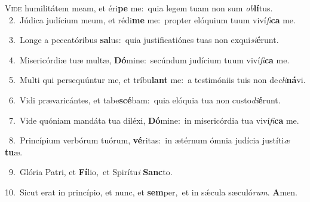 \lettrine{\initial\textcolor{\initialcolor}{V}}{ide} humilitátem meam, et éri\textbf{pe} me:~\star quia legem tuam non sum \textit{ob}\-\textbf{lí}tus.\\
{\numbfont\textcolor{\numbcolor}{~2.}}~Júdica judícium meum, et rédi\textbf{me} me:~\star propter elóquium tuum viví\-\textit{fi}\-\textbf{ca} me.\par
{\numbfont\textcolor{\numbcolor}{~3.}}~Longe a peccatóribus \textbf{sa}\-lus:~\star quia justificatiónes tuas non exqui\-\textit{si}\-\textbf{é}runt.\par
{\numbfont\textcolor{\numbcolor}{~4.}}~Misericórdiæ tuæ multæ, \textbf{Dó}\-mine:~\star secúndum judícium tuum viví\-\textit{fi}\-\textbf{ca} me.\par
{\numbfont\textcolor{\numbcolor}{~5.}}~Multi qui persequúntur me, et tríbu\textbf{lant} me:~\star a testimóniis tuis non de\-\textit{cli}\-\textbf{ná}vi.\par
{\numbfont\textcolor{\numbcolor}{~6.}}~Vidi prævaricántes, et tabe\-\textbf{scé}\-bam:~\star quia elóquia tua non custo\-\textit{di}\-\textbf{é}runt.\par
{\numbfont\textcolor{\numbcolor}{~7.}}~Vide quóniam mandáta tua diléxi, \textbf{Dó}\-mine:~\star in misericórdia tua viví\-\textit{fi}\-\textbf{ca} me.\par
{\numbfont\textcolor{\numbcolor}{~8.}}~Princípium verbórum tuórum, \textbf{vé}\-ritas:~\star in ætérnum ómnia judícia justíti\textit{æ} \textbf{tu}\-æ.\par
{\numbfont\textcolor{\numbcolor}{~9.}}~Glória Patri, et \textbf{Fí}\-lio,~\star et Spirítu\textit{i} \textbf{Sanc}\-to.\par
{\numbfont\textcolor{\numbcolor}{10.}}~Sicut erat in princípio, et nunc, et \textbf{sem}\-per,~\star et in sǽcula sæculó\-\textit{rum}\-. \textbf{A}\-men.\par
